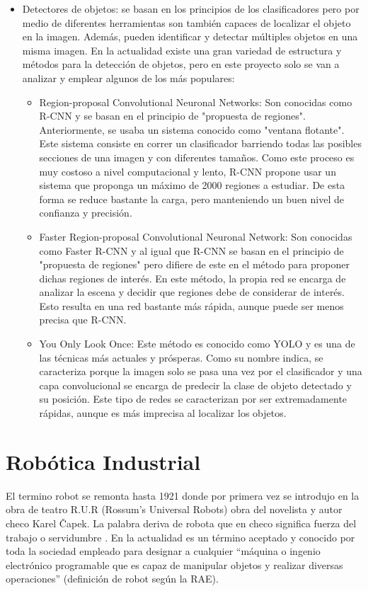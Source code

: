 \begin{itemize}
\item Detectores de objetos: se basan en los principios de los clasificadores pero por medio de diferentes herramientas son también capaces de localizar el objeto en la imagen. Además, pueden identificar y detectar múltiples objetos en una misma imagen. En la actualidad existe una gran variedad de estructura y métodos para la detección de objetos, pero en este proyecto solo se van a analizar y emplear algunos de los más populares:
\begin{itemize}
\item Region-proposal Convolutional Neuronal Networks: Son conocidas como R-CNN y se basan en el principio de "propuesta de regiones". Anteriormente, se usaba un sistema conocido como "ventana flotante". Este sistema consiste en correr un clasificador barriendo todas las posibles secciones de una imagen y con diferentes tamaños. Como este proceso es muy costoso a nivel computacional y lento, R-CNN propone usar un sistema que proponga un máximo de 2000 regiones a estudiar. De esta forma se reduce bastante la carga, pero manteniendo un buen nivel de confianza y precisión.
\item Faster Region-proposal Convolutional Neuronal Network: Son conocidas como Faster R-CNN y al igual que R-CNN se basan en el principio de "propuesta de regiones" pero difiere de este en el método para proponer dichas regiones de interés. En este método, la propia red se encarga de analizar la escena y decidir que regiones debe de considerar de interés. Esto resulta en una red bastante más rápida, aunque puede ser menos precisa que R-CNN.
\item You Only Look Once: Este método es conocido como YOLO y es una de las técnicas más actuales y prósperas. Como su nombre indica, se caracteriza porque la imagen solo se pasa una vez por el clasificador y una capa convolucional se encarga de predecir la clase de objeto detectado y su posición. Este tipo de redes se caracterizan por ser extremadamente rápidas, aunque es más imprecisa al localizar los objetos.
\end{itemize}
\end{itemize}


\section{Robótica Industrial}
\label{sec:Robotica}
El termino robot se remonta hasta 1921 donde por primera vez se introdujo en la obra de teatro R.U.R (Rossum’s Universal Robots) obra del novelista y autor checo Karel Čapek. La palabra deriva de robota que en checo significa fuerza del trabajo o servidumbre \cite{robotica}. En la actualidad es un término aceptado y conocido por toda la sociedad empleado para designar a cualquier “máquina o ingenio electrónico programable que es capaz de manipular objetos y realizar diversas operaciones” (definición de robot según la RAE).

